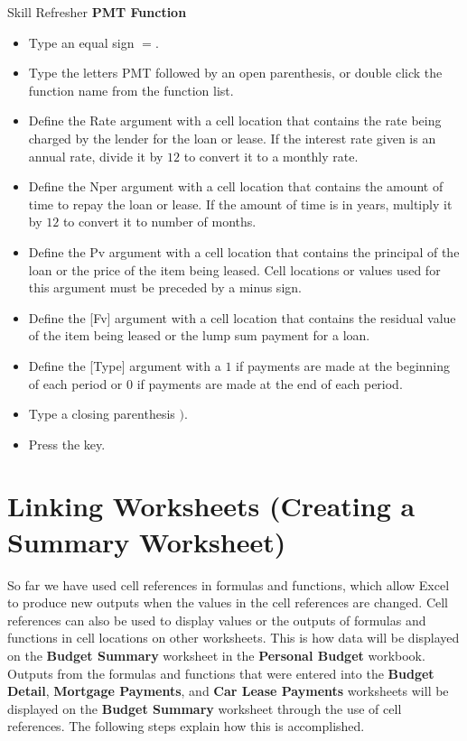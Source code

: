 \begin{center}
	\begin{sklbox}{Skill Refresher}
		\textbf{PMT Function}
		\\
		\begin{itemize}
			\setlength{\itemsep}{0pt}
			\setlength{\parskip}{0pt}
			\setlength{\parsep}{0pt}
			
			\item Type an equal sign $ = $.
			\item Type the letters PMT followed by an open parenthesis, or double click the function name from the function list.
			\item Define the Rate argument with a cell location that contains the rate being charged by the lender for the loan or lease. If the interest rate given is an annual rate, divide it by $ 12 $ to convert it to a monthly rate.
			\item Define the Nper argument with a cell location that contains the amount of time to repay the loan or lease. If the amount of time is in years, multiply it by $ 12 $ to convert it to number of months.
			\item Define the Pv argument with a cell location that contains the principal of the loan or the price of the item being leased. Cell locations or values used for this argument must be preceded by a minus sign.
			\item Define the [Fv] argument with a cell location that contains the residual value of the item being leased or the lump sum payment for a loan.
			\item Define the [Type] argument with a $ 1 $ if payments are made at the beginning of each period or $ 0 $ if payments are made at the end of each period.
			\item Type a closing parenthesis $ ) $.
			\item Press the  key.
			
		\end{itemize}
	\end{sklbox}
\end{center}

\section{Linking Worksheets (Creating a Summary Worksheet)}

So far we have used cell references in formulas and functions, which allow Excel to produce new outputs when the values in the cell references are changed. Cell references can also be used to display values or the outputs of formulas and functions in cell locations on other worksheets. This is how data will be displayed on the \textbf{Budget Summary} worksheet in the \textbf{Personal Budget} workbook. Outputs from the formulas and functions that were entered into the \textbf{Budget Detail}, \textbf{Mortgage Payments}, and \textbf{Car Lease Payments} worksheets will be displayed on the \textbf{Budget Summary} worksheet through the use of cell references. The following steps explain how this is accomplished.

